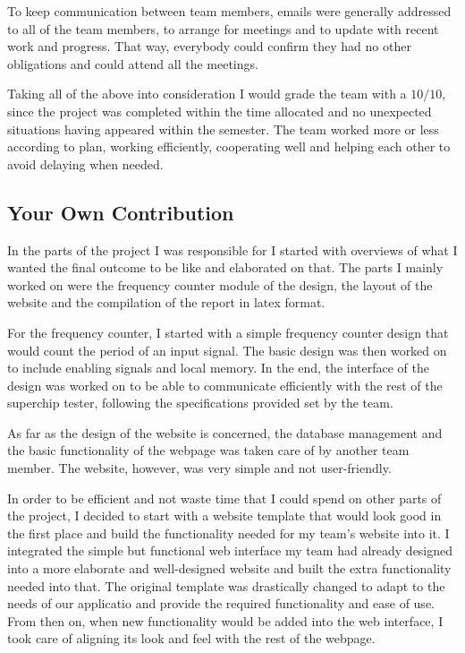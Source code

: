 To keep communication between team members, emails were generally addressed to all of the team members, to arrange for meetings and to update with recent work and progress. That way, everybody could confirm they had no other obligations and could attend all the meetings.

Taking all of the above into consideration I would grade the team with a $10/10$, since the project was completed within the time allocated and no unexpected situations having appeared within the semester. The team worked more or less according to plan, working efficiently, cooperating well and helping each other to avoid delaying when needed.


\subsection{Your Own Contribution}
\label{sec:own_contribution}

%

In the parts of the project I was responsible for I started with overviews of what I wanted the final outcome to be like and elaborated on that. The parts I mainly worked on were the frequency counter module of the design, the layout of the website and the compilation of the report in latex format.

For the frequency counter, I started with a simple frequency counter design that would count the period of an input signal. The basic design was then worked on to include enabling signals and local memory. In the end, the interface of the design was worked on to be able to communicate efficiently with the rest of the superchip tester, following the specifications provided set by the team.

As far as the design of the website is concerned, the database management and the basic functionality of the webpage was taken care of by another team member. The website, however, was very simple and not user-friendly.

In order to be efficient and not waste time that I could spend on other parts of the project, I decided to start with a website template that would look good in the first place and build the functionality needed for my team's website into it. I integrated the simple but functional web interface my team had already designed into a more elaborate and well-designed website and built the extra functionality needed into that. The original template was drastically changed to adapt to the needs of our applicatio and provide the required functionality and ease of use. From then on, when new functionality would be added into the web interface, I took care of aligning its look and feel with the rest of the webpage.

